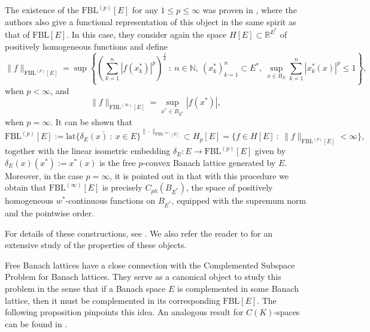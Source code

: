 \documentclass[11pt]{amsart}
\theoremstyle{definition}
\numberwithin{equation}{section}
\newcommand{\fbl}{\text{FBL}}
\begin{document}
The existence of the $\fbl^{(p)}[E]$ for any $1\leq p\leq \infty$ was proven in \cite{JLTTT}, where the authors also give a functional representation of this object in the same spirit as that of $\fbl[E]$. In this case, they consider again the space $H[E]\subset \mathbb{R}^{E^*}$ of positively homogeneous functions and define  
\begin{equation*}
\|f\|_{\fbl^{(p)}[E]}=\sup\left\{\left(\sum_{k=1}^n |f(x_k^*)|^p\right)^\frac{1}{p}\::\:n\in\mathbb{N}, \:(x_k^*)_{k=1}^n\subset E^*,\:\sup_{x\in B_E}\sum_{k=1}^n|x_k^*(x)|^p\leq 1\right\},
\end{equation*}
when $p<\infty$, and
\begin{equation*}
	\|f\|_{\fbl^{(\infty)}[E]}= \sup_{x^*\in B_{E^*}} |f(x^*)|,
\end{equation*}
when $p=\infty$. It can be shown that 
$$
\fbl^{(p)}[E]:=\overline{\text{lat}\{\delta_E(x)\::\: x\in E\}}^{\|\cdot\|_{\fbl^{(p)}[E]}}\subset H_p[E]=\{f\in H[E]\::\: \|f\|_{\fbl^{(p)}[E]}<\infty\},
$$
together with the linear isometric embedding $\delta_E:E\to\fbl^{(p)}[E]$ given by $\delta_E(x)(x^*):=x^*(x)$ is the free $p$-convex Banach lattice generated by $E$. Moreover, in the case $p=\infty$, it is pointed out in \cite[Proposition 2.2]{OTTT24} that 
with this procedure we obtain that $\fbl^{(\infty)}[E]$ is precisely $C_{ph}(B_{E^*})$, the space of positively homogeneous $w^*$-continuous functions on $B_{E^*}$, equipped with the supremum norm and the pointwise order. 

For details of these constructions, see \cite{JLTTT}. We also refer the reader to \cite{OTTT24} for an extensive study of the properties of these objects.



Free Banach lattices have a close connection with the Complemented Subspace Problem for Banach lattices. They serve as a canonical object to study this problem in the sense that if a Banach space $E$ is complemented in some Banach lattice, then it must be complemented in its corresponding $\fbl[E]$. The following proposition pinpoints this idea. An analogous result for $C(K)$-spaces can be found in \cite[Lemma, p.~247]{BL}.
\end{document}
